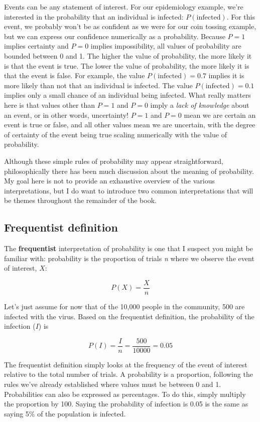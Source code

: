 \documentclass[
]{book}
\begin{document}
Events can be any statement of interest. For our epidemiology example, we're interested in the probability that an individual is infected: \(P(\text{infected})\). For this event, we probably won't be as confident as we were for our coin tossing example, but we can express our confidence numerically as a probability. Because \(P=1\) implies certainty and \(P=0\) implies impossibility, all values of probability are bounded between 0 and 1. The higher the value of probability, the more likely it is that the event is true. The lower the value of probability, the more likely it is that the event is false. For example, the value \(P(\text{infected}) = 0.7\) implies it is more likely than not that an individual is infected. The value \(P(\text{infected}) = 0.1\) implies only a small chance of an individual being infected. What really matters here is that values other than \(P=1\) and \(P=0\) imply a \emph{lack of knowledge} about an event, or in other words, uncertainty! \(P=1\) and \(P=0\) mean we are certain an event is true or false, and all other values mean we are uncertain, with the degree of certainty of the event being true scaling numerically with the value of probability.

Although these simple rules of probability may appear straightforward, philosophically there has been much discussion about the meaning of probability. My goal here is not to provide an exhaustive overview of the various interpretations, but I do want to introduce two common interpretations that will be themes throughout the remainder of the book.

\subsection{Frequentist definition}\label{frequentist-definition}

The \textbf{frequentist} interpretation of probability is one that I suspect you might be familiar with: probability is the proportion of trials \emph{n} where we observe the event of interest, \(X\):

\[
P(X) = \frac{X}{n}
\]

Let's just assume for now that of the 10,000 people in the community, 500 are infected with the virus. Based on the frequentist definition, the probability of the infection (\(I\)) is

\[
P(I) = \frac{I}{n} = \frac{500}{10000}=0.05
\]

The frequentist definition simply looks at the frequency of the event of interest relative to the total number of trials. A probability is a proportion, following the rules we've already established where values must be between 0 and 1. Probabilities can also be expressed as percentages. To do this, simply multiply the proportion by 100. Saying the probability of infection is 0.05 is the same as saying 5\% of the population is infected.
\end{document}
